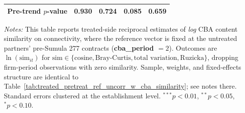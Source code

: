 \begin{table}[H]
\begin{tabular}{lcccc}
Pre-trend $p$-value & 0.930 & 0.724 & 0.085 & 0.659 \\
\bottomrule
\end{tabular}
\begin{minipage}{\linewidth}
\footnotesize\vspace{4pt}
\textit{Notes:} This table reports treated-side reciprocal estimates of \emph{log} CBA content similarity on connectivity, where the reference vector is fixed at the untreated partners' pre-Sumula 277 contracts (\textbf{cba\_period $= 2$}). Outcomes are $\ln(\text{sim}_{it})$ for $\text{sim} \in \{\text{cosine}, \text{Bray-Curtis}, \text{total variation}, \text{Ruzicka}\}$, dropping firm-period observations with zero similarity. Sample, weights, and fixed-effects structure are identical to Table~\ref{tab:treated_pretreat_ref_uncorr_w_cba_similarity}; see notes there. Standard errors clustered at the establishment level. $^{***}p<0.01$, $^{**}p<0.05$, $^{*}p<0.10$.
\end{minipage}
\end{table}
